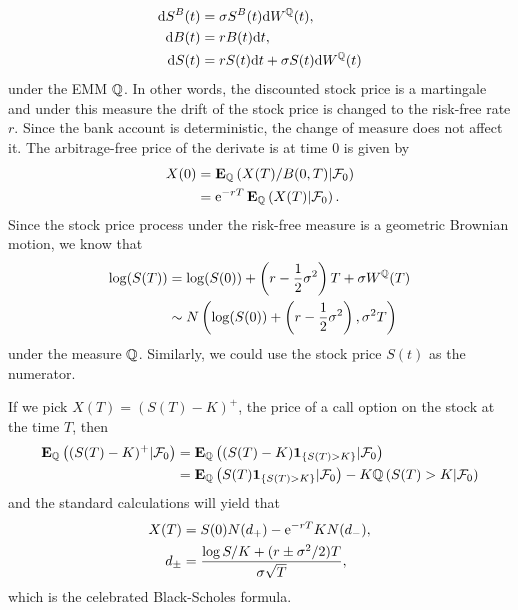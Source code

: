   \begin{align}
    \mathrm{d} S^B(t) &= \sigma S^B(t) \mathrm{d} W^{\mathbb{Q}}(t), \\
    \mathrm{d} B (t) &= r B (t) \mathrm{d} t, \\
    \label{BlackScholesProcessesUnderEMM}
    \mathrm{d} S(t) &= r S(t) \mathrm{d} t + \sigma S(t) \mathrm{d} W^{\mathbb{Q}}(t)
  \end{align}
under the EMM $\mathbb{Q}$. In other words, the discounted stock price is a martingale and under this measure the drift of the stock price is changed to the risk-free rate $r$. Since the bank account is deterministic, the change of measure does not affect it. The arbitrage-free price of the derivate is at time $0$ is given by
  \begin{align}
    X(0) &= \operatorname{\boldsymbol{\mathrm{E}}}_{\mathbb{Q}} \left( X(T) / B (0,T) | \mathcal{F}_0 \right) \\ &= \mathrm{e}^{-rT} \operatorname{\boldsymbol{\mathrm{E}}}_{\mathbb{Q}} \left( X(T) | \mathcal{F}_0 \right) .
  \end{align}
Since the stock price process under the risk-free measure is a geometric Brownian motion, we know that
  \begin{align}
    \log (S(T) ) &= \log (S(0) ) + \left( r  - \frac{1}{2} \sigma^2 \right) T + \sigma W^{\mathbb{Q}}(T) \\ &\sim N \left( \log (S(0) ) + \left( r  - \frac{1}{2} \sigma^2 \right), \sigma^2 T \right)
  \end{align}
under the measure $\mathbb{Q}$. Similarly, we could use the stock price $S(t)$ as the numerator. 

If we pick $X(T) = (S(T)-K)^+$, the price of a call option on the stock at the time $T$, then
	\begin{align}
		\operatorname{\boldsymbol{\mathrm{E}}}_{\mathbb{Q}} \left( (S(T)-K)^+ | \mathcal{F}_0 \right) &= \operatorname{\boldsymbol{\mathrm{E}}}_{\mathbb{Q}} \left( (S(T)-K) \boldsymbol{1}_{ \{ S(T) > K\} } | \mathcal{F}_0 \right) \\
		&= \operatorname{\boldsymbol{\mathrm{E}}}_{\mathbb{Q}} \left( S(T) \boldsymbol{1}_{ \{ S(T) > K\} } | \mathcal{F}_0 \right) - K \mathbb{Q} \left( S(T) > K | \mathcal{F}_0 \right)
	\end{align}
and the standard calculations will yield that
  \begin{align}
    X(T) &= S(0) N(d_+)  -  \mathrm{e}^{-rT} K N(d_-) , \\
    d_{\pm} &= \frac{\log S/K + (r \pm \sigma^2/2 )T }{\sigma \sqrt{T}},
  \end{align}
which is the celebrated Black-Scholes formula.

